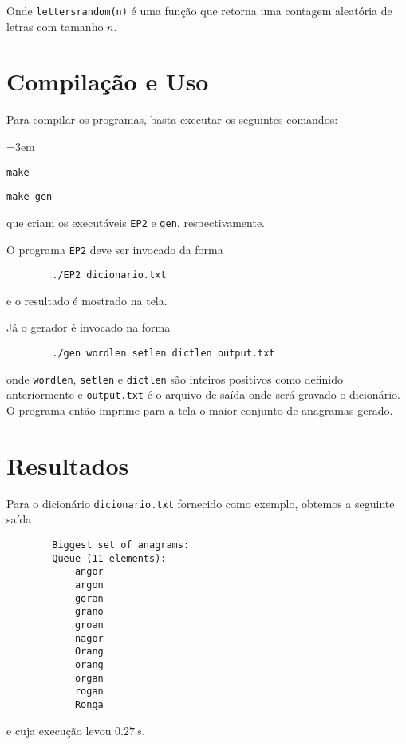 \documentclass[a4paper]{article}
\newcommand{\ttt}{\texttt}
\begin{document}
    Onde \ttt{lettersrandom(n)} é uma função que retorna uma contagem aleatória de letras com tamanho $n$.

\newpage
\section{Compilação e Uso}
    Para compilar os programas, basta executar os seguintes comandos:
    \begin{description}\leftskip=3em
        \item[Programa:] \ttt{make}
        \item[Gerador:] \ttt{make gen}
    \end{description}
    que criam os executáveis \ttt{EP2} e \ttt{gen}, respectivamente.

    O programa \ttt{EP2} deve ser invocado da forma
    \begin{lstlisting}
        ./EP2 dicionario.txt
    \end{lstlisting}
    e o resultado é mostrado na tela.

    Já o gerador é invocado na forma
    \begin{lstlisting}
        ./gen wordlen setlen dictlen output.txt
    \end{lstlisting}
    onde \ttt{wordlen}, \ttt{setlen} e \ttt{dictlen} são inteiros positivos como definido anteriormente e \ttt{output.txt} é o arquivo de saída onde será gravado o dicionário. O programa então imprime para a tela o maior conjunto de anagramas gerado.

\section{Resultados}
    Para o dicionário \ttt{dicionario.txt} fornecido como exemplo, obtemos a seguinte saída
    \begin{lstlisting}
        Biggest set of anagrams:
        Queue (11 elements):
            angor
            argon
            goran
            grano
            groan
            nagor
            Orang
            orang
            organ
            rogan
            Ronga
    \end{lstlisting}
    e cuja execução levou $0.27\,s$.
\end{document}

